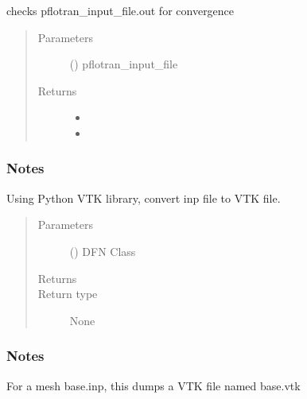 \documentclass[letterpaper,10pt,english]{sphinxmanual}
\begin{document}
\begin{fulllineitems}
\label{\detokenize{pydfnworks:pydfnworks.dfnFlow.pflotran.check_pflotran_convergence}}
checks pflotran\_input\_file.out for convergence
\begin{quote}\begin{description}
\item[{Parameters}] \leavevmode
{} () \textendash{} pflotran\_input\_file

\item[{Returns}] \leavevmode
\begin{itemize}
\item {} 

\item {} 

\end{itemize}


\end{description}\end{quote}
\subsubsection*{Notes}

\end{fulllineitems}


\begin{fulllineitems}
\label{\detokenize{pydfnworks:pydfnworks.dfnFlow.pflotran.inp2vtk_python}}
Using Python VTK library, convert inp file to VTK file.
\begin{quote}\begin{description}
\item[{Parameters}] \leavevmode
{} () \textendash{} DFN Class

\item[{Returns}] \leavevmode


\item[{Return type}] \leavevmode
None

\end{description}\end{quote}
\subsubsection*{Notes}

For a mesh base.inp, this dumps a VTK file named base.vtk

\end{fulllineitems}
\end{document}
